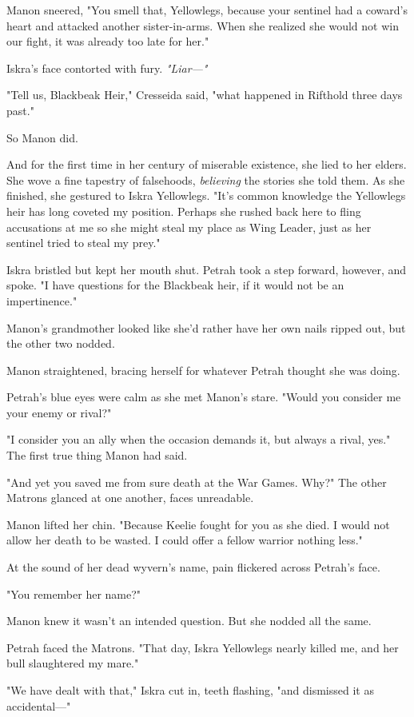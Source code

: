 Manon sneered, "You smell that, Yellowlegs, because your sentinel had a coward's heart and attacked another sister-in-arms. When she realized she would not win our fight, it was already too late for her."

Iskra's face contorted with fury. \emph{"Liar---"}

"Tell us, Blackbeak Heir," Cresseida said, "what happened in Rifthold three days past."

So Manon did.

And for the first time in her century of miserable existence, she lied to her elders. She wove a fine tapestry of falsehoods, \emph{believing}
the stories she told them. As she finished, she gestured to Iskra Yellowlegs. "It's common knowledge the Yellowlegs heir has long coveted my position. Perhaps she rushed back here to fling accusations at me so she might steal my place as Wing Leader, just as her sentinel tried to steal my prey."

Iskra bristled but kept her mouth shut. Petrah took a step forward, however, and spoke. "I have questions for the Blackbeak heir, if it would not be an impertinence."

Manon's grandmother looked like she'd rather have her own nails ripped out, but the other two nodded.

Manon straightened, bracing herself for whatever Petrah thought she was doing.

Petrah's blue eyes were calm as she met Manon's stare. "Would you consider me your enemy or rival?"

"I consider you an ally when the occasion demands it, but always a rival, yes." The first true thing Manon had said.

"And yet you saved me from sure death at the War Games. Why?" The other Matrons glanced at one another, faces unreadable.

Manon lifted her chin. "Because Keelie fought for you as she died. I would not allow her death to be wasted. I could offer a fellow warrior nothing less."

At the sound of her dead wyvern's name, pain flickered across Petrah's face.

"You remember her name?"

Manon knew it wasn't an intended question. But she nodded all the same.

Petrah faced the Matrons. "That day, Iskra Yellowlegs nearly killed me, and her bull slaughtered my mare."

"We have dealt with that," Iskra cut in, teeth flashing, "and dismissed it as accidental---"

